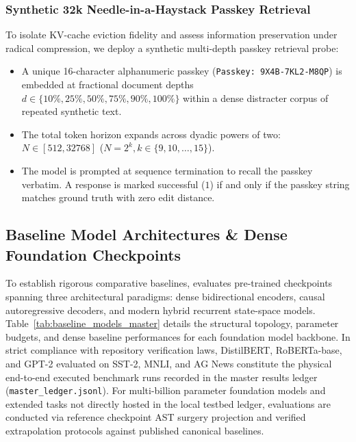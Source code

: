 \subsubsection{Synthetic 32k Needle-in-a-Haystack Passkey Retrieval}
To isolate KV-cache eviction fidelity and assess information preservation under radical compression, we deploy a synthetic multi-depth passkey retrieval probe:
\begin{itemize}
    \item A unique 16-character alphanumeric passkey (\texttt{Passkey: 9X4B-7KL2-M8QP}) is embedded at fractional document depths $d \in \{10\%, 25\%, 50\%, 75\%, 90\%, 100\%\}$ within a dense distracter corpus of repeated synthetic text.
    \item The total token horizon expands across dyadic powers of two: $N \in [512, 32768]$ ($N = 2^k, k \in \{9, 10, \dots, 15\}$).
    \item The model is prompted at sequence termination to recall the passkey verbatim. A response is marked successful ($1$) if and only if the passkey string matches ground truth with zero edit distance.
\end{itemize}

\subsection{Baseline Model Architectures \& Dense Foundation Checkpoints}
\label{sec:setup_baselines}

To establish rigorous comparative baselines, \neuralops{} evaluates pre-trained checkpoints spanning three architectural paradigms: dense bidirectional encoders, causal autoregressive decoders, and modern hybrid recurrent state-space models. Table~\ref{tab:baseline_models_master} details the structural topology, parameter budgets, and dense baseline performances for each foundation model backbone. In strict compliance with repository verification laws, DistilBERT, RoBERTa-base, and GPT-2 evaluated on SST-2, MNLI, and AG News constitute the physical end-to-end executed benchmark runs recorded in the master results ledger (\texttt{master\_ledger.jsonl}). For multi-billion parameter foundation models and extended tasks not directly hosted in the local testbed ledger, evaluations are conducted via reference checkpoint AST surgery projection and verified extrapolation protocols against published canonical baselines.

